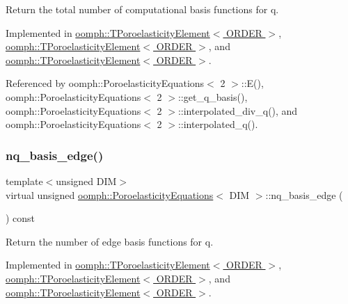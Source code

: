 Return the total number of computational basis functions for q. 



Implemented in \hyperlink{classoomph_1_1TPoroelasticityElement_afdb47aa5ae5af5ddcc4bf3d1fbd4b066}{oomph\+::\+T\+Poroelasticity\+Element$<$ O\+R\+D\+E\+R $>$}, \hyperlink{classoomph_1_1TPoroelasticityElement_a0e7bb4a27c8d609ee6cb5abb6cc63c81}{oomph\+::\+T\+Poroelasticity\+Element$<$ O\+R\+D\+E\+R $>$}, and \hyperlink{classoomph_1_1TPoroelasticityElement_aea11019e66b5f28fbdc3dfb4a538dac1}{oomph\+::\+T\+Poroelasticity\+Element$<$ O\+R\+D\+E\+R $>$}.



Referenced by oomph\+::\+Poroelasticity\+Equations$<$ 2 $>$\+::\+E(), oomph\+::\+Poroelasticity\+Equations$<$ 2 $>$\+::get\+\_\+q\+\_\+basis(), oomph\+::\+Poroelasticity\+Equations$<$ 2 $>$\+::interpolated\+\_\+div\+\_\+q(), and oomph\+::\+Poroelasticity\+Equations$<$ 2 $>$\+::interpolated\+\_\+q().

\mbox{\label{classoomph_1_1PoroelasticityEquations_a81b78261be29e506dc70a59c2925c061}} 
\subsubsection{\texorpdfstring{nq\+\_\+basis\+\_\+edge()}{nq\_basis\_edge()}}
{\footnotesize\ttfamily template$<$unsigned D\+IM$>$ \\
virtual unsigned \hyperlink{classoomph_1_1PoroelasticityEquations}{oomph\+::\+Poroelasticity\+Equations}$<$ D\+IM $>$\+::nq\+\_\+basis\+\_\+edge (\begin{DoxyParamCaption}{ }\end{DoxyParamCaption}) const\hspace{0.3cm}{\ttfamily [pure virtual]}}



Return the number of edge basis functions for q. 



Implemented in \hyperlink{classoomph_1_1TPoroelasticityElement_a65dd05b91f2953a7229042a4cf95257b}{oomph\+::\+T\+Poroelasticity\+Element$<$ O\+R\+D\+E\+R $>$}, \hyperlink{classoomph_1_1TPoroelasticityElement_a983a46fd022fae7bf5a4120a526a4e86}{oomph\+::\+T\+Poroelasticity\+Element$<$ O\+R\+D\+E\+R $>$}, and \hyperlink{classoomph_1_1TPoroelasticityElement_ac757396ac2f88ed07d6b3b0e7a364fb7}{oomph\+::\+T\+Poroelasticity\+Element$<$ O\+R\+D\+E\+R $>$}.



